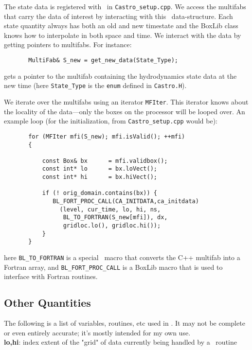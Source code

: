 The state data is registered with \boxlib\ in {\tt Castro\_setup.cpp}.
We access the multifabs that carry the data of interest by interacting
with this \boxlib\ data-structure.  Each state quantity always has both
an old and new timestate and the BoxLib class knows how to interpolate
in both space and time.  We interact with the data by getting pointers
to multifabs.  For instance:
\begin{verbatim}
       MultiFab& S_new = get_new_data(State_Type);
\end{verbatim}
gets a pointer to the multifab containing the hydrodynamics state data
at the new time (here {\tt State\_Type} is the {\tt enum} defined in 
{\tt Castro.H}).

We iterate over the multifabs using an iterator {\tt MFIter}.  This
iterator knows about the locality of the data---only the boxes on the
processor will be looped over.  An example loop (for the
initialization, from {\tt Castro\_setup.cpp} would be):
\begin{verbatim}
       for (MFIter mfi(S_new); mfi.isValid(); ++mfi)
       {

           const Box& bx      = mfi.validbox();
           const int* lo      = bx.loVect();
           const int* hi      = bx.hiVect();

           if (! orig_domain.contains(bx)) {
              BL_FORT_PROC_CALL(CA_INITDATA,ca_initdata)
                (level, cur_time, lo, hi, ns,
                 BL_TO_FORTRAN(S_new[mfi]), dx,
                 gridloc.lo(), gridloc.hi());
           }
       }
\end{verbatim}
here {\tt BL\_TO\_FORTRAN} is a special \boxlib\ macro that converts the
C++ multifab into a Fortran array, and {\tt BL\_FORT\_PROC\_CALL}
is a BoxLib macro that is used to interface with Fortran routines.

\subsection{Other Quantities}

The following is a list of variables, routines, etc used in \castro. It
may not be complete or even entirely accurate; it's mostly intended
for my own use.\\

{\bf lo,hi}: index extent of the "grid" of data currently being
handled by a \castro\ routine\\

